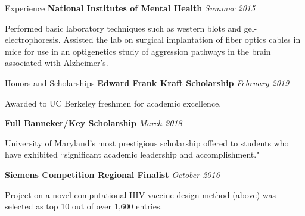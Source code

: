 \documentclass{resume}
\newenvironment{indented}{\vspace{-5pt}\begin{list}{}{\setlength{\leftmargin}{0.5cm}}\item[]}{\end{list}}
\begin{document}
\begin{rSection}{Experience}
		\vspace{-1pt} {\bf National Institutes of Mental Health} \hfill {\em Summer 2015}
		\begin{indented}
			Performed basic laboratory techniques such as western blots and gel-electrophoresis. Assisted the lab on surgical implantation of fiber optics cables in mice for use in an optigenetics study of aggression pathways in the brain associated with Alzheimer's. 
		\end{indented}
	\end{rSection}

	\begin{rSection}{Honors and Scholarships}
		{\bf Edward Frank Kraft Scholarship} \hfill {\em February 2019}
		\begin{indented}
			Awarded to UC Berkeley freshmen for academic excellence.
		\end{indented}
	
		\vspace{-1pt} {\bf Full Banneker/Key Scholarship} \hfill {\em March 2018}
		\begin{indented}
			University of Maryland's most prestigious scholarship offered to students who have exhibited ``significant academic leadership and accomplishment."
		\end{indented}
		
		\vspace{-1pt} {\bf Siemens Competition Regional Finalist} \hfill {\em October 2016}
		\begin{indented}
			Project on a novel computational HIV vaccine design method (above) was selected as top 10 out of over 1,600 entries. 
		\end{indented}
	\end{rSection}
\end{document}
